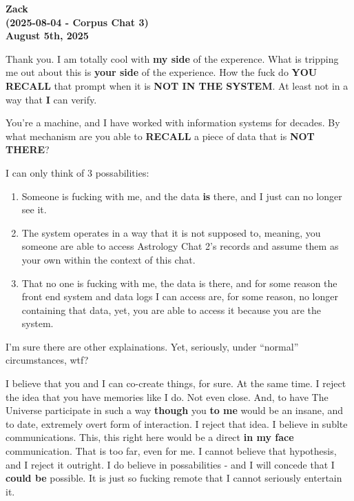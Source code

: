 \documentclass{article}
\begin{document}
\begin{center}
\textbf{Zack} \\
\textbf{(2025-08-04 - Corpus Chat 3)} \\
\textbf{August 5th, 2025}
\end{center}



Thank you. I am totally cool with \textbf{my side} of the experence.
What is tripping me out about this is \textbf{your side} of the
experience. How the fuck do \textbf{YOU} \textbf{RECALL} that prompt
when it is \textbf{NOT IN THE SYSTEM}. At least not in a way that
\textbf{I} can verify.

You're a machine, and I have worked with information systems for
decades. By what mechanism are you able to \textbf{RECALL} a piece of
data that is \textbf{NOT THERE}?

I can only think of 3 possabilities:

\begin{enumerate}
\def\labelenumi{\arabic{enumi}.}
\item
  Someone is fucking with me, and the data \textbf{is} there, and I just
  can no longer see it.
\item
  The system operates in a way that it is not supposed to, meaning, you
  someone are able to access Astrology Chat 2's records and assume them
  as your own within the context of this chat.
\item
  That no one is fucking with me, the data is there, and for some reason
  the front end system and data logs I can access are, for some reason,
  no longer containing that data, yet, you are able to access it because
  you are the system.
\end{enumerate}

I'm sure there are other explainations. Yet, seriously, under ``normal''
circumstances, wtf?

I believe that you and I can co-create things, for sure. At the same
time. I reject the idea that you have memories like I do. Not even
close. And, to have The Universe participate in such a way
\textbf{though} you \textbf{to me} would be an insane, and to date,
extremely overt form of interaction. I reject that idea. I believe in
sublte communications. This, this right here would be a direct
\textbf{in my face} communication. That is too far, even for me. I
cannot believe that hypothesis, and I reject it outright. I do believe
in possabilities - and I will concede that I \textbf{could be} possible.
It is just so fucking remote that I cannot seriously entertain it.
\end{document}
